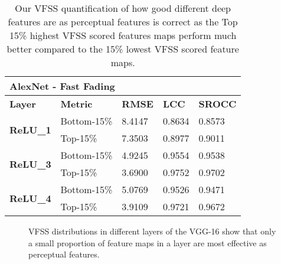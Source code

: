 \documentclass[10pt,twocolumn,letterpaper]{article}
\begin{document}
\begin{table*}[]
\centering
\caption{Our VFSS quantification of how good different deep features are as perceptual features is correct as the Top 15\% highest VFSS scored features maps perform much better compared to the 15\% lowest VFSS scored feature maps.}
\begin{tabular}{|l|l|l|l|l|}
\hline
\multicolumn{5}{|l|}{\textbf{AlexNet - Fast Fading}}                                                \\ \hline
\textbf{Layer}                    & \textbf{Metric} & \textbf{RMSE} & \textbf{LCC} & \textbf{SROCC} \\ \hline
\multirow{2}{*}{\textbf{ReLU\_1}} & Bottom-15\%             & 8.4147        & 0.8634       & 0.8573         \\ \cline{2-5} 
                                  & Top-15\%             & 7.3503        & 0.8977       & 0.9011         \\ \hline
\multirow{2}{*}{\textbf{ReLU\_3}} & Bottom-15\%             & 4.9245        & 0.9554       & 0.9538         \\ \cline{2-5} 
                                  & Top-15\%             & 3.6900        & 0.9752       & 0.9702         \\ \hline
\multirow{2}{*}{\textbf{ReLU\_4}} & Bottom-15\%             & 5.0769        & 0.9526       & 0.9471         \\ \cline{2-5} 
                                  & Top-15\%             & 3.9109        & 0.9721       & 0.9672         \\ \hline
\end{tabular}
\end{table*}

\begin{figure*}[]
\centering
{}
  \hfill
  \hfill
  \hfill
  \hfill
  \hfill
  \hfill
  \caption{VFSS distributions in different layers of the VGG-16 show that only a small proportion of feature maps in a layer are most effective as perceptual features.}
\end{figure*}
\end{document}
